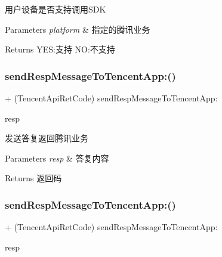 用户设备是否支持调用\+S\+DK 
\begin{DoxyParams}{Parameters}
{\em platform} & 指定的腾讯业务 \\
\hline
\end{DoxyParams}
\begin{DoxyReturn}{Returns}
Y\+ES\+:支持 NO\+:不支持 
\end{DoxyReturn}
\mbox{\label{interface_tencent_api_interface_a9c499a7e750658a6f81c92d1b0b27908}} 
\subsubsection{\texorpdfstring{send\+Resp\+Message\+To\+Tencent\+App\+:()}{sendRespMessageToTencentApp:()}\hspace{0.1cm}{\footnotesize\ttfamily [1/2]}}
{\footnotesize\ttfamily + (Tencent\+Api\+Ret\+Code) send\+Resp\+Message\+To\+Tencent\+App\+: \begin{DoxyParamCaption}\item[{(\mbox{\hyperlink{interface_tencent_api_resp}{Tencent\+Api\+Resp}} $\ast$)}]{resp }\end{DoxyParamCaption}}

发送答复返回腾讯业务 
\begin{DoxyParams}{Parameters}
{\em resp} & 答复内容 \\
\hline
\end{DoxyParams}
\begin{DoxyReturn}{Returns}
返回码 
\end{DoxyReturn}
\mbox{\label{interface_tencent_api_interface_a9c499a7e750658a6f81c92d1b0b27908}} 
\subsubsection{\texorpdfstring{send\+Resp\+Message\+To\+Tencent\+App\+:()}{sendRespMessageToTencentApp:()}\hspace{0.1cm}{\footnotesize\ttfamily [2/2]}}
{\footnotesize\ttfamily + (Tencent\+Api\+Ret\+Code) send\+Resp\+Message\+To\+Tencent\+App\+: \begin{DoxyParamCaption}\item[{(\mbox{\hyperlink{interface_tencent_api_resp}{Tencent\+Api\+Resp}} $\ast$)}]{resp }\end{DoxyParamCaption}}

